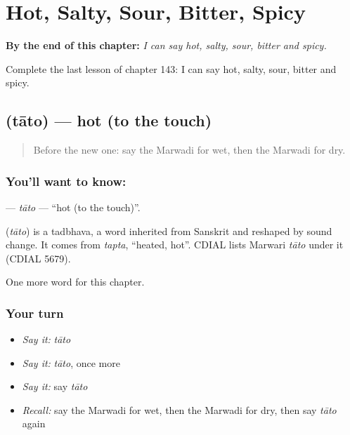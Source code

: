 
\chapter{Hot, Salty, Sour, Bitter, Spicy}
\label{ch:mw-hot-salty-sour-bitter-spicy}

\begin{chapteropening}
\textbf{By the end of this chapter:} \emph{I can say hot, salty, sour, bitter and spicy.}

Complete the last lesson of chapter 143: I can say hot, salty, sour, bitter and spicy.
\end{chapteropening}

\section[\texorpdfstring{\mw{तातो} (tāto)}{तातो (tāto)}]{ (tāto) — hot (to the touch)}

\label{lesson:MW-C143-tato}



\begin{quote}
Before the new one: say the Marwadi for wet, then the Marwadi for dry.
\end{quote}

\subsection*{You'll want to know: }
\textbf{} — \emph{tāto} — \textquotedblleft{}hot (to the touch)\textquotedblright{}.

\begin{cousinweb}
\textbf{} (\emph{tāto}) is a tadbhava, a word inherited from Sanskrit and reshaped by sound change. It comes from \emph{tapta}, \textquotedblleft{}heated, hot\textquotedblright{}. CDIAL lists Marwari \emph{tāto} under it (CDIAL 5679).
\end{cousinweb}

\begin{grammarlens}[title={What you've built}]
One more word for this chapter.
\end{grammarlens}

\subsection*{Your turn}
\begin{itemize}
\raggedright
  \item \emph{Say it:} \emph{tāto}
  \item \emph{Say it:} \emph{tāto}, once more
  \item \emph{Say it:} say \emph{tāto}
  \item \emph{Recall:} say the Marwadi for wet, then the Marwadi for dry, then say \emph{tāto} again
\end{itemize}

